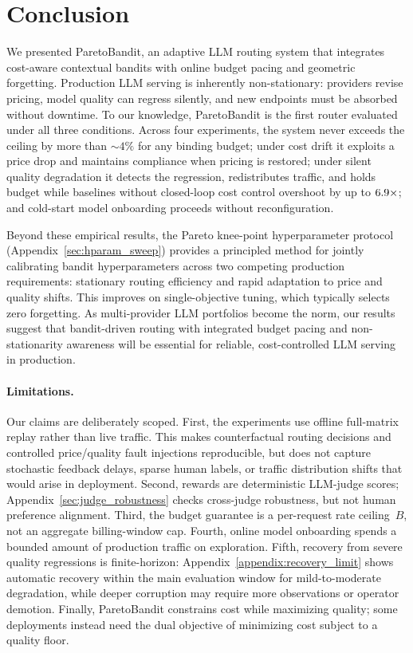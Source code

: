 \section{Conclusion}
\label{sec:conclusion}

We presented ParetoBandit, an adaptive LLM routing system that integrates cost-aware contextual bandits with online budget pacing and geometric forgetting.
Production LLM serving is inherently non-stationary: providers revise pricing, model quality can regress silently, and new endpoints must be absorbed without downtime.
To our knowledge, ParetoBandit is the first router evaluated under all three conditions.
Across four experiments, the system never exceeds the ceiling by more than ${\sim}4\%$ for any binding budget; under cost drift it exploits a price drop and maintains compliance when pricing is restored; under silent quality degradation it detects the regression, redistributes traffic, and holds budget while baselines without closed-loop cost control overshoot by up to $6.9{\times}$; and cold-start model onboarding proceeds without reconfiguration.

Beyond these empirical results, the Pareto knee-point hyperparameter protocol (Appendix~\ref{sec:hparam_sweep}) provides a principled method for jointly calibrating bandit hyperparameters across two competing production requirements: stationary routing efficiency and rapid adaptation to price and quality shifts.
This improves on single-objective tuning, which typically selects zero forgetting.
As multi-provider LLM portfolios become the norm, our results suggest that bandit-driven routing with integrated budget pacing and non-stationarity awareness will be essential for reliable, cost-controlled LLM serving in production.
\vspace{-4pt}
\paragraph{Limitations.}
Our claims are deliberately scoped. First, the experiments use offline full-matrix replay rather than live traffic. This makes counterfactual routing decisions and controlled price/quality fault injections reproducible, but does not capture stochastic feedback delays, sparse human labels, or traffic distribution shifts that would arise in deployment. Second, rewards are deterministic LLM-judge scores; Appendix~\ref{sec:judge_robustness} checks cross-judge robustness, but not human preference alignment. Third, the budget guarantee is a per-request rate ceiling~$B$, not an aggregate billing-window cap. Fourth, online model onboarding spends a bounded amount of production traffic on exploration. Fifth, recovery from severe quality regressions is finite-horizon: Appendix~\ref{appendix:recovery_limit} shows automatic recovery within the main evaluation window for mild-to-moderate degradation, while deeper corruption may require more observations or operator demotion. Finally, ParetoBandit constrains cost while maximizing quality; some deployments instead need the dual objective of minimizing cost subject to a quality floor.
\vspace{-4pt}
